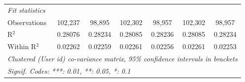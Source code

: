 \begin{table}[htbp]
\begin{threeparttable}[b]
\begin{tabular}{lcccccc}
         \midrule
         \emph{Fit statistics}\\
         Observations                    & 102,237             & 98,895              & 102,302             & 98,957              & 102,302             & 98,957\\  
         R$^2$                           & 0.28076             & 0.28234             & 0.28085             & 0.28236             & 0.28085             & 0.28234\\  
         Within R$^2$                    & 0.02262             & 0.02259             & 0.02261             & 0.02256             & 0.02261             & 0.02253\\  
         \midrule \midrule
         \multicolumn{7}{l}{\emph{Clustered (User id) co-variance matrix, 95\% confidence intervals in brackets}}\\
         \multicolumn{7}{l}{\emph{Signif. Codes: ***: 0.01, **: 0.05, *: 0.1}}\\
      \end{tabular}
   \end{threeparttable}
\end{table}


